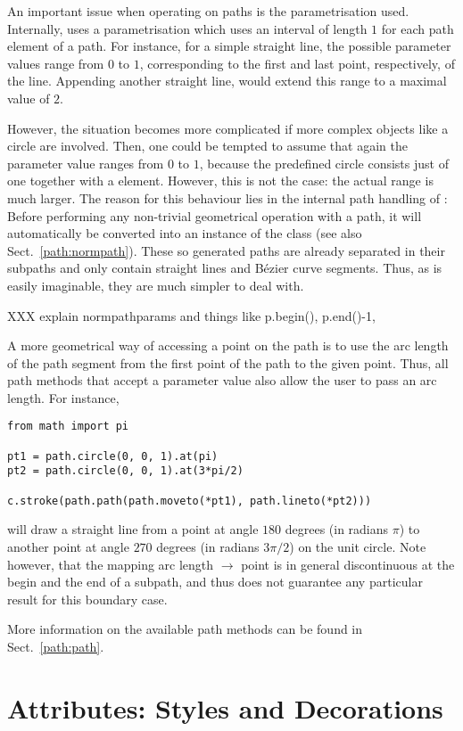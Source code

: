 An important issue when operating on paths is the parametrisation
used. Internally, \PyX{} uses a parametrisation which uses an interval
of length $1$ for each path element of a path. For instance, for a
simple straight line, the possible parameter values range from $0$ to
$1$, corresponding to the first and last point, respectively, of the
line. Appending another straight line, would extend this range to a
maximal value of $2$. 

However, the situation becomes more complicated if more complex
objects like a circle are involved. Then, one could be tempted to
assume that again the parameter value ranges from $0$ to $1$, because
the predefined circle consists just of one  together with a
 element. However, this is not the case: the actual
range is much larger. The reason for this behaviour lies in the
internal path handling of \PyX: Before performing any non-trivial
geometrical operation with a path, it will automatically be converted
into an instance of the  class (see also
Sect.~\ref{path:normpath}). These so generated paths are already
separated in their subpaths and only contain straight lines and
B\'ezier curve segments. Thus, as is easily imaginable, they are much
simpler to deal with.

XXX explain normpathparams and things like p.begin(), p.end()-1,

A more geometrical way of accessing a point on the path is to use the
arc length of the path segment from the first point of the path to the
given point. Thus, all \PyX{} path methods that accept a parameter
value also allow the user to pass an arc length. For instance,
\begin{verbatim}
from math import pi

pt1 = path.circle(0, 0, 1).at(pi)
pt2 = path.circle(0, 0, 1).at(3*pi/2)

c.stroke(path.path(path.moveto(*pt1), path.lineto(*pt2)))
\end{verbatim}
will draw a straight line from a point at angle $180$ degrees (in
radians $\pi$) to another point at angle $270$ degrees (in radians
$3\pi/2$) on the unit circle. Note however, that the mapping arc
length $\to$ point is in general discontinuous at the begin and the
end of a subpath, and thus \PyX{} does not guarantee any particular
result for this boundary case.

More information on the available path methods can be found 
in Sect.~\ref{path:path}. 

\section{Attributes: Styles and Decorations}

